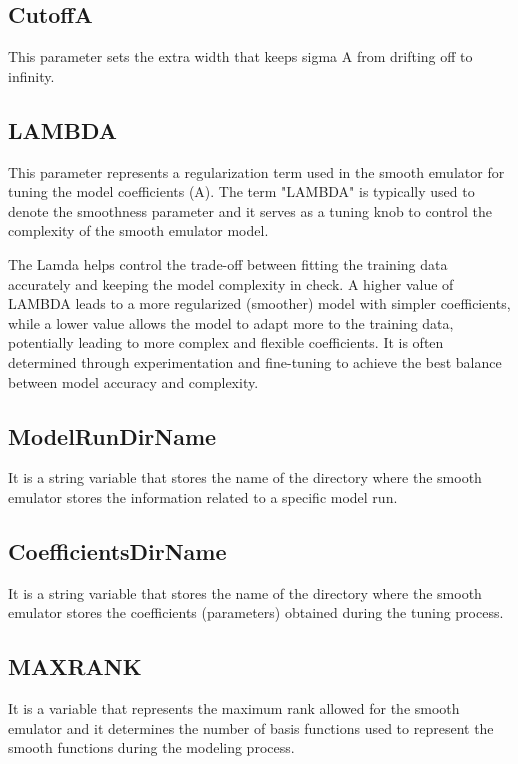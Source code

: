 \documentclass[12pt]{article}
\numberwithin{equation}{section}
\numberwithin{figure}{section}
\begin{document}
\subsection{CutoffA}
This parameter sets the extra width that keeps sigma A from drifting off to infinity.  

\subsection{LAMBDA}

This parameter represents a regularization term used in the smooth emulator for tuning the model coefficients (A). The term "LAMBDA" is typically used to denote the smoothness parameter and it serves as a tuning knob to control the complexity of the smooth emulator model.

The Lamda helps control the trade-off between fitting the training data accurately and keeping the model complexity in check. A higher value of LAMBDA leads to a more regularized (smoother) model with simpler coefficients, while a lower value allows the model to adapt more to the training data, potentially leading to more complex and flexible coefficients. It is often determined through experimentation and fine-tuning to achieve the best balance between model accuracy and complexity.

\subsection{ModelRunDirName}
It is a string variable that stores the name of the directory where the smooth emulator stores the information related to a specific model run.    \\

\subsection{CoefficientsDirName} 
It is a string variable that stores the name of the directory where the smooth emulator stores the coefficients (parameters) obtained during the tuning process. \\

\subsection{MAXRANK}

It is a variable that represents the maximum rank allowed for the smooth emulator and it determines the number of basis functions used to represent the smooth functions during the modeling process. 
\end{document}
